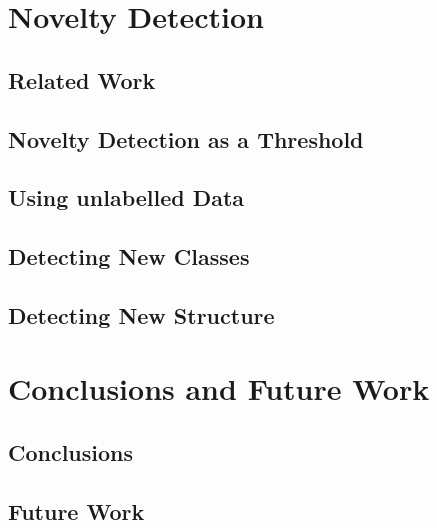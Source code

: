 \chapter{Novelty Detection}
\section*{}
\section{Related Work}
\section{Novelty Detection as a Threshold}
\section{Using unlabelled Data}
\section{Detecting New Classes} 
\section{Detecting New Structure}

\chapter{Conclusions and Future Work}
\section*{}

\section{Conclusions}
\section{Future Work}


